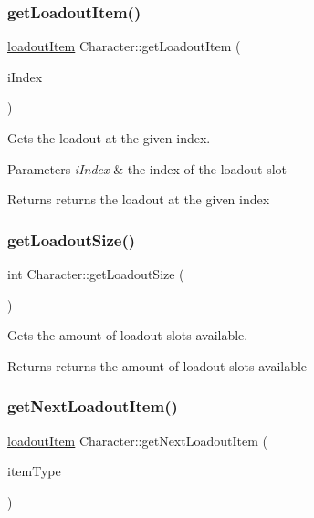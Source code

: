 \subsubsection{\texorpdfstring{get\+Loadout\+Item()}{getLoadoutItem()}}
{\footnotesize\ttfamily \hyperlink{_character_8h_a00971beaa8e80879643e933973580d61}{loadout\+Item} Character\+::get\+Loadout\+Item (\begin{DoxyParamCaption}\item[{int}]{i\+Index }\end{DoxyParamCaption})}



Gets the loadout at the given index. 


\begin{DoxyParams}{Parameters}
{\em i\+Index} & the index of the loadout slot \\
\hline
\end{DoxyParams}
\begin{DoxyReturn}{Returns}
returns the loadout at the given index 
\end{DoxyReturn}
\mbox{\label{class_character_a555596279fd74ebe904f2d54885abb55}} 
\subsubsection{\texorpdfstring{get\+Loadout\+Size()}{getLoadoutSize()}}
{\footnotesize\ttfamily int Character\+::get\+Loadout\+Size (\begin{DoxyParamCaption}{ }\end{DoxyParamCaption})}



Gets the amount of loadout slots available. 

\begin{DoxyReturn}{Returns}
returns the amount of loadout slots available 
\end{DoxyReturn}
\mbox{\label{class_character_a2faad0be62bac6958cf6a9acab3f1f92}} 
\subsubsection{\texorpdfstring{get\+Next\+Loadout\+Item()}{getNextLoadoutItem()}}
{\footnotesize\ttfamily \hyperlink{_character_8h_a00971beaa8e80879643e933973580d61}{loadout\+Item} Character\+::get\+Next\+Loadout\+Item (\begin{DoxyParamCaption}\item[{\hyperlink{_character_8h_a00971beaa8e80879643e933973580d61}{loadout\+Item}}]{item\+Type }\end{DoxyParamCaption})}



